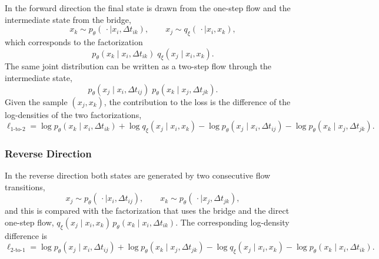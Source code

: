 In the forward direction the final state is drawn from the one-step flow and the intermediate state from the bridge,
\begin{equation}
    \label{eq:app_fwd_sample}
    x_k \sim p_\theta(\,\cdot \mid x_i, \Delta t_{ik}), \qquad
    x_j \sim q_\xi(\,\cdot \mid x_i, x_k),
\end{equation}
which corresponds to the factorization
\begin{equation}
    \label{eq:app_fwd_fact}
    p_\theta(x_k \mid x_i, \Delta t_{ik})\; q_\xi(x_j \mid x_i, x_k).
\end{equation}
The same joint distribution can be written as a two-step flow through the intermediate state,
\begin{equation}
    \label{eq:app_fwd_twostep}
    p_\theta(x_j \mid x_i, \Delta t_{ij})\; p_\theta(x_k \mid x_j, \Delta t_{jk}).
\end{equation}
Given the sample $(x_j, x_k)$, the contribution to the loss is the difference of the log-densities of the two factorizations,
\begin{equation}
    \label{eq:app_l12}
    \ell_{1\text{-}\mathrm{to}\text{-}2}
    = \log p_\theta(x_k \mid x_i, \Delta t_{ik})
    + \log q_\xi(x_j \mid x_i, x_k)
    - \log p_\theta(x_j \mid x_i, \Delta t_{ij})
    - \log p_\theta(x_k \mid x_j, \Delta t_{jk}).
\end{equation}

\subsubsection{Reverse Direction}

In the reverse direction both states are generated by two consecutive flow transitions,
\begin{equation}
    \label{eq:app_rev_sample}
    x_j \sim p_\theta(\,\cdot \mid x_i, \Delta t_{ij}), \qquad
    x_k \sim p_\theta(\,\cdot \mid x_j, \Delta t_{jk}),
\end{equation}
and this is compared with the factorization that uses the bridge and the direct one-step flow, $q_\xi(x_j \mid x_i, x_k)\,p_\theta(x_k \mid x_i, \Delta t_{ik})$. The corresponding log-density difference is
\begin{equation}
    \label{eq:app_l21}
    \ell_{2\text{-}\mathrm{to}\text{-}1}
    = \log p_\theta(x_j \mid x_i, \Delta t_{ij})
    + \log p_\theta(x_k \mid x_j, \Delta t_{jk})
    - \log q_\xi(x_j \mid x_i, x_k)
    - \log p_\theta(x_k \mid x_i, \Delta t_{ik}).
\end{equation}

